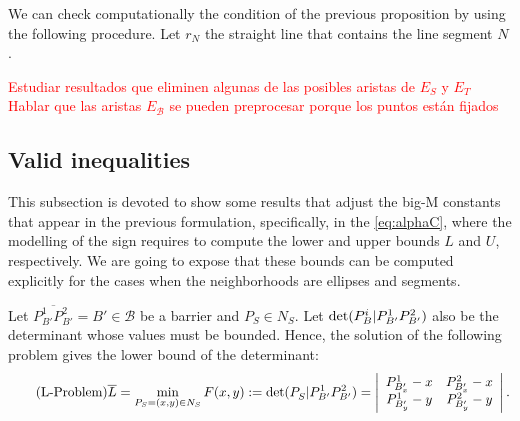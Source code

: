 \documentclass[a4paper]{elsarticle}
\newcommand{\B}{{\mathcal B}}
\begin{document}
We can check computationally the condition of the previous proposition by using the following procedure. Let $r_N$ the straight line that contains the line segment $N$.

\begin{algorithm}[H]


\end{algorithm}



\textcolor{red}{Estudiar resultados que eliminen algunas de las posibles aristas de $E_S$ y $E_T$}
\textcolor{red}{Hablar que las aristas $E_{\mathcal B}$ se pueden preprocesar porque los puntos están fijados}

\subsection{Valid inequalities}
This subsection is devoted to show some results that adjust the big-M constants that appear in the previous formulation, specifically, in the \eqref{eq:alphaC}, where the modelling of the sign requires to compute the lower and upper bounds $L$ and $U$, respectively. We are going to expose that these bounds can be computed explicitly for the cases when the neighborhoods are ellipses and segments.

Let $\overline{P^1_{B'}P^2_{B'}}=B'\in\B$ be a barrier and $P_S\in N_S$. Let $\det({P_B^i|P_{B'}^1P_{B'}^2})$ also be the determinant whose values must be bounded. Hence, the solution of the following problem gives the lower bound of the determinant:
\begin{equation*}\label{eq:L-Problem}\tag{L-Problem}
\overline{L}=\min_{P_S=(x,y)\in N_S}F(x,y):=\det({P^{}_S|P_{B'}^1P_{B'}^2})=\left|
\begin{array}{cc}
P^{1}_{B'_x}-x & P^{2}_{B'_x}-x \\
P^{1}_{B'_y}-y & P^{2}_{B'_y}-y
\end{array}
\right|.
\end{equation*}
\end{document}

